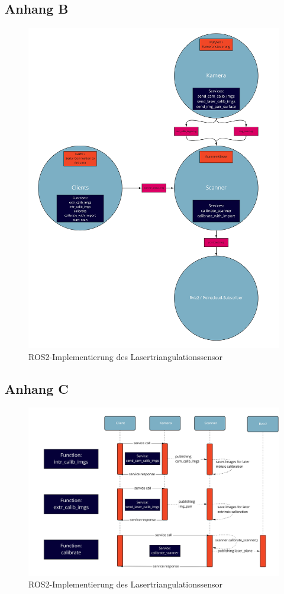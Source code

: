 \documentclass[	12pt,
				a4paper,
				bibliography=totoc,
				listof=totoc,
				index=totoc,
				twoside,
				headsepline,
				footsepline,
				ngerman]{scrartcl}
\begin{document}
\begin{appendix}
		\subsection{Anhang B}\label{anhang-b}
		\begin{figure}[h!]
			\centering
			\includegraphics[width=0.9\linewidth]{img/anhang/ROS2_implementation.jpg}
			\caption{ROS2-Implementierung des Lasertriangulationssensor}
			\label{fig:ros2_all}
		\end{figure}
		\newpage
		\subsection{Anhang C}\label{anhang-c}
			\begin{figure}[h!]
				\centering
				\includegraphics[width=1\linewidth]{img/anhang/vorgang_kalibrierung.jpg}
				\caption{ROS2-Implementierung des Lasertriangulationssensor}
				\label{fig:vorgang_kalibrierung}
			\end{figure}
		\newpage

\end{appendix}
\end{document}
